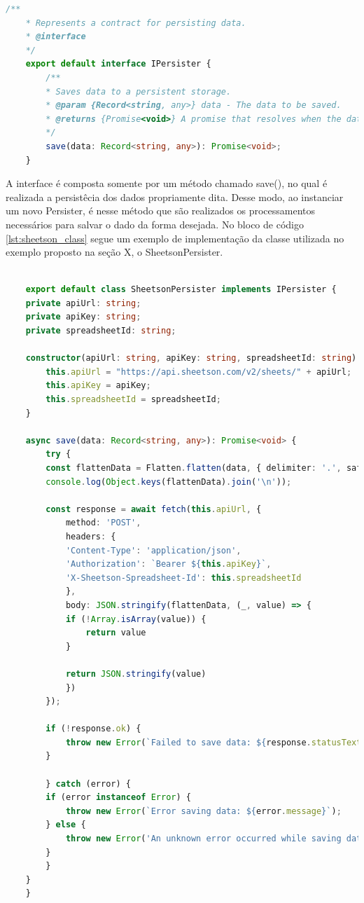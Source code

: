 \documentclass[12pt]{tcc}
\begin{document}
	\begin{lstlisting}[label={lst:ipersister_abstract_class}, caption={Implementação da classe responsável pela persistência dos dados.}, language=TypeScript, breaklines=true]
	/**
	* Represents a contract for persisting data.
	* @interface
	*/
	export default interface IPersister {
		/**
		* Saves data to a persistent storage.
		* @param {Record<string, any>} data - The data to be saved.
		* @returns {Promise<void>} A promise that resolves when the data is saved.
		*/
		save(data: Record<string, any>): Promise<void>;
	}
	\end{lstlisting}

	A interface é composta somente por um método chamado save(), no qual é realizada a persistêcia dos dados propriamente dita. Desse modo, ao instanciar um novo Persister, é nesse método que são realizados os processamentos necessários para salvar o dado da forma desejada. No bloco de código \ref{lst:sheetson_class} segue um exemplo de implementação da classe utilizada no exemplo proposto na seção X, o SheetsonPersister.

	\begin{lstlisting}[label={lst:sheetson_class}, caption={Implementação da classe responsável pela persistência dos dados usando o Sheetson.}, language=TypeScript, breaklines=true]

	export default class SheetsonPersister implements IPersister {
	private apiUrl: string;
	private apiKey: string;
	private spreadsheetId: string;

	constructor(apiUrl: string, apiKey: string, spreadsheetId: string) {
		this.apiUrl = "https://api.sheetson.com/v2/sheets/" + apiUrl;
		this.apiKey = apiKey;
		this.spreadsheetId = spreadsheetId;
	}

	async save(data: Record<string, any>): Promise<void> {
		try {
		const flattenData = Flatten.flatten(data, { delimiter: '.', safe: true });
		console.log(Object.keys(flattenData).join('\n'));
		
		const response = await fetch(this.apiUrl, {
			method: 'POST',
			headers: {
			'Content-Type': 'application/json',
			'Authorization': `Bearer ${this.apiKey}`,
			'X-Sheetson-Spreadsheet-Id': this.spreadsheetId
			},
			body: JSON.stringify(flattenData, (_, value) => {
			if (!Array.isArray(value)) {
				return value
			}

			return JSON.stringify(value)
			})
		});

		if (!response.ok) {
			throw new Error(`Failed to save data: ${response.statusText}`);
		}

		} catch (error) {
		if (error instanceof Error) {
			throw new Error(`Error saving data: ${error.message}`);
		} else {
			throw new Error('An unknown error occurred while saving data.');
		}
		}
	}
	}
	\end{lstlisting}
\end{document}
